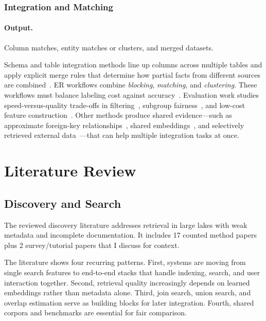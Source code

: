 \documentclass[sigconf]{acmart}
\begin{document}
\subsubsection{Integration and Matching}
\paragraph{Output.} Column matches, entity matches or clusters, and merged datasets.

Schema and table integration methods line up columns across multiple tables and apply explicit merge rules that determine how partial facts from different sources are combined~\cite{10.1145/3555041.3589732,10.14778/3574245.3574274,10.14778/3742728.3742757,10184612}.
ER workflows combine \emph{blocking}, \emph{matching}, and \emph{clustering}. These workflows must balance labeling cost against accuracy~\cite{10.1145/3709715,10.1145/3588722,10.1145/3588712,10.1145/3626711,10.1145/3588938}.
Evaluation work studies speed-versus-quality trade-offs in filtering~\cite{10184692}, subgroup fairness~\cite{10.14778/3611479.3611525}, and low-cost feature construction~\cite{11112979,10.14778/3681954.3681987}.
Other methods produce shared evidence---such as approximate foreign-key relationships~\cite{10.1145/3588929}, shared embeddings~\cite{10184556}, and selectively retrieved external data~\cite{10.14778/3611479.3611535,10.14778/3603581.3603602}---that can help multiple integration tasks at once.



\section{Literature Review}

\subsection{Discovery and Search}
The reviewed discovery literature addresses retrieval in large lakes with weak metadata and incomplete documentation. It includes 17 counted method papers plus 2 survey/tutorial papers that I discuss for context.

The literature shows four recurring patterns. First, systems are moving from single search features to end-to-end stacks that handle indexing, search, and user interaction together. Second, retrieval quality increasingly depends on learned embeddings rather than metadata alone. Third, join search, union search, and overlap estimation serve as building blocks for later integration. Fourth, shared corpora and benchmarks are essential for fair comparison.
\end{document}

